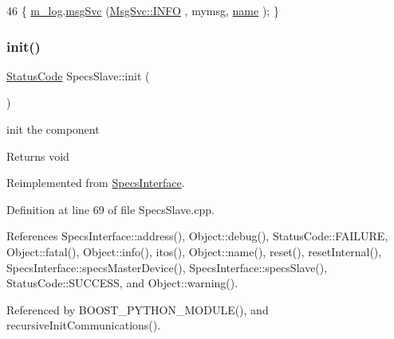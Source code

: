 \begin{DoxyCode}
46 \{ \hyperlink{classObject_a0d269813dd7ac1f24bc143031e2963f2}{m\_log}.\hyperlink{classMsgSvc_ad25f18047920cc59a314e5098259711c}{msgSvc} (\hyperlink{classMsgSvc_ae671eb7301996cd049d2da8a65925926ad2fcf3f3e734fc41ee097cc23670ce51}{MsgSvc::INFO}    , mymsg, \hyperlink{classObject_a300f4c05dd468c7bb8b3c968868443c1}{name} ); \}
\end{DoxyCode}
\mbox{\label{classSpecsSlave_ab34b5117373a334027d3a5cf33287bb6}} 
\subsubsection{\texorpdfstring{init()}{init()}}
{\footnotesize\ttfamily \hyperlink{classStatusCode}{Status\+Code} Specs\+Slave\+::init (\begin{DoxyParamCaption}{ }\end{DoxyParamCaption})\hspace{0.3cm}{\ttfamily [virtual]}}

init the component

\begin{DoxyReturn}{Returns}
void 
\end{DoxyReturn}


Reimplemented from \hyperlink{classSpecsInterface_a99ec05cbe0d15892afbec6feaf33c89b}{Specs\+Interface}.



Definition at line 69 of file Specs\+Slave.\+cpp.



References Specs\+Interface\+::address(), Object\+::debug(), Status\+Code\+::\+F\+A\+I\+L\+U\+RE, Object\+::fatal(), Object\+::info(), itos(), Object\+::name(), reset(), reset\+Internal(), Specs\+Interface\+::specs\+Master\+Device(), Specs\+Interface\+::specs\+Slave(), Status\+Code\+::\+S\+U\+C\+C\+E\+SS, and Object\+::warning().



Referenced by B\+O\+O\+S\+T\+\_\+\+P\+Y\+T\+H\+O\+N\+\_\+\+M\+O\+D\+U\+L\+E(), and recursive\+Init\+Communications().



